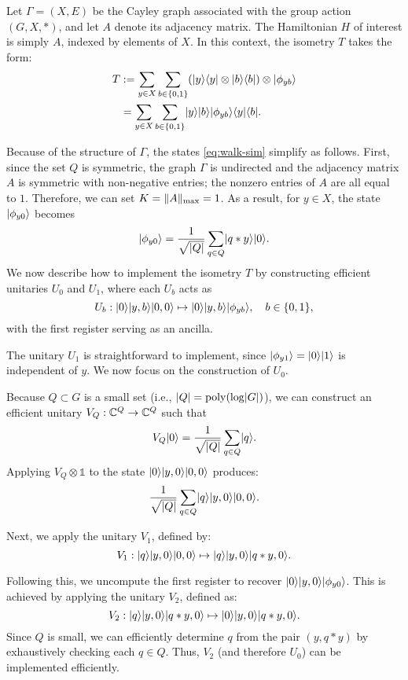 \documentclass[11pt]{article}
\theoremstyle{definition}
\begin{document}
Let \( \Gamma = (X, E) \) be the Cayley graph associated with the group action \( (G, X, *) \), and let \( A \) denote its adjacency matrix. The Hamiltonian \( H \) of interest is simply \( A \), indexed by elements of \( X \). In this context, the isometry \( T \) takes the form:
\begin{align*}
T
& := \sum_{y \in X} \sum_{b \in \{0, 1\}} (\lvert y\rangle\langle y\rvert \otimes \lvert b\rangle\langle b\rvert) \otimes \lvert\phi_{yb}\rangle \\
& = \sum_{y \in X} \sum_{b \in \{0, 1\}} \lvert y\rangle \lvert b\rangle \lvert\phi_{yb}\rangle \langle y\rvert \langle b\rvert.
\end{align*}


Because of the structure of $\Gamma$, the states \eqref{eq:walk-sim} simplify as follows. First, since the set $Q$ is symmetric, the graph $\Gamma$ is undirected and the adjacency matrix $A$ is symmetric with non-negative entries; the nonzero entries of $A$ are all equal to $1$. Therefore, we can set $K = \lVert A\rVert_{\mathrm{max}} = 1$. As a result, for $y \in X$, the state $\lvert\phi_{y0}\rangle$ becomes
\[ \lvert\phi_{y0}\rangle = \frac{1}{\sqrt{\lvert Q\rvert}} \sum_{q \in Q} \lvert q * y\rangle \lvert0\rangle. \]
We now describe how to implement the isometry \( T \) by constructing efficient unitaries \( U_0 \) and \( U_1 \), where each \( U_b \) acts as
\[
U_b : \lvert0\rangle \lvert y, b\rangle \lvert0, 0\rangle \mapsto \lvert0\rangle \lvert y, b\rangle \lvert\phi_{yb}\rangle, \quad b \in \{0, 1\},
\]
with the first register serving as an ancilla.

The unitary \( U_1 \) is straightforward to implement, since \( \lvert\phi_{y1}\rangle = \lvert0\rangle \lvert1\rangle \) is independent of \( y \). We now focus on the construction of \( U_0 \).

Because \( Q \subset G \) is a small set (i.e., \( \lvert Q\rvert = \operatorname{poly}(\log \lvert G\rvert) \)), we can construct an efficient unitary \( V_Q : \mathbb{C}^Q \to \mathbb{C}^Q \) such that
\[
V_Q \lvert0\rangle = \frac{1}{\sqrt{\lvert Q\rvert}} \sum_{q \in Q} \lvert q\rangle.
\]
Applying \( V_Q \otimes \mathds{1} \) to the state \( \lvert0\rangle \lvert y, 0\rangle \lvert0, 0\rangle \) produces:
\[
\frac{1}{\sqrt{\lvert Q\rvert}} \sum_{q \in Q} \lvert q\rangle \lvert y, 0\rangle \lvert0, 0\rangle.
\]

Next, we apply the unitary \( V_1 \), defined by:
\[
V_1 : \lvert q\rangle \lvert y, 0\rangle \lvert0, 0\rangle \mapsto \lvert q\rangle \lvert y, 0\rangle \lvert q * y, 0\rangle.
\]

Following this, we uncompute the first register to recover \( \lvert0\rangle \lvert y, 0\rangle \lvert\phi_{y0}\rangle \). This is achieved by applying the unitary \( V_2 \), defined as:
\[
V_2 : \lvert q\rangle \lvert y, 0\rangle \lvert q * y, 0\rangle \mapsto \lvert0\rangle \lvert y, 0\rangle \lvert q * y, 0\rangle.
\]
Since \( Q \) is small, we can efficiently determine \( q \) from the pair \( (y, q * y) \) by exhaustively checking each \( q \in Q \). Thus, \( V_2 \) (and therefore \( U_0 \)) can be implemented efficiently.
\end{document}

